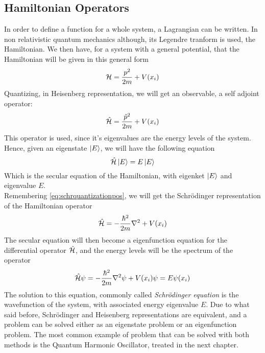 \documentclass[../qm.tex]{subfiles}
\begin{document}
	\subsection{Hamiltonian Operators}
	In order to define a function for a whole system, a Lagrangian can be written. In non relativistic quantum mechanics although, its Legendre tranform is used, the Hamiltonian. We then have, for a system with a general potential, that the Hamiltonian will be given in this general form
	\begin{equation}
		\mathcal{H}=\frac{p^2}{2m}+V(x_i)
		\label{eq:hamiltonianclass}
	\end{equation}
	Quantizing, in Heisenberg representation, we will get an observable, a self adjoint operator:
	\begin{equation}
		\hat{\mathcal{H}}=\frac{\hat{p}^2}{2m}+V(x_i)
		\label{eq:quantumham}
	\end{equation}
	This operator is used, since it's eigenvalues are the energy levels of the system.\\
	Hence, given an eigenstate $\ket{E}$, we will have the following equation
	\begin{equation}
		\hat{\mathcal{H}}\ket{E}=E\ket{E}
		\label{eq:seculareqham}
	\end{equation}
	Which is the secular equation of the Hamiltonian, with eigenket $\ket{E}$ and eigenvalue $E$.\\
	Remembering \eqref{eq:schrquantizationpos}, we will get the Schrödinger representation of the Hamiltonian operator
	\begin{equation}
		\hat{\mathcal{H}}=-\frac{\hbar^2}{2m}\nabla^2+V(x_i)
		\label{eq:schrham}
	\end{equation}
	The secular equation will then become a eigenfunction equation for the differential operator $\hat{\mathcal{H}}$, and the energy levels will be the spectrum of the operator
	\begin{equation}
		\hat{\mathcal{H}}\psi=-\frac{\hbar^2}{2m}\nabla^2\psi+V(x_i)\psi=E\psi(x_i)
		\label{eq:schreigfun}
	\end{equation}
	The solution to this equation, commonly called \textit{Schrödinger equation} is the wavefunction of the system, with associated energy eigenvalue $E$. Due to what said before, Schrödinger and Heisenberg representations are equivalent, and a problem can be solved either as an eigenstate problem or an eigenfunction problem. The most common example of problem that can be solved with both methods is the Quantum Harmonic Oscillator, treated in the next chapter.\\
\end{document}
